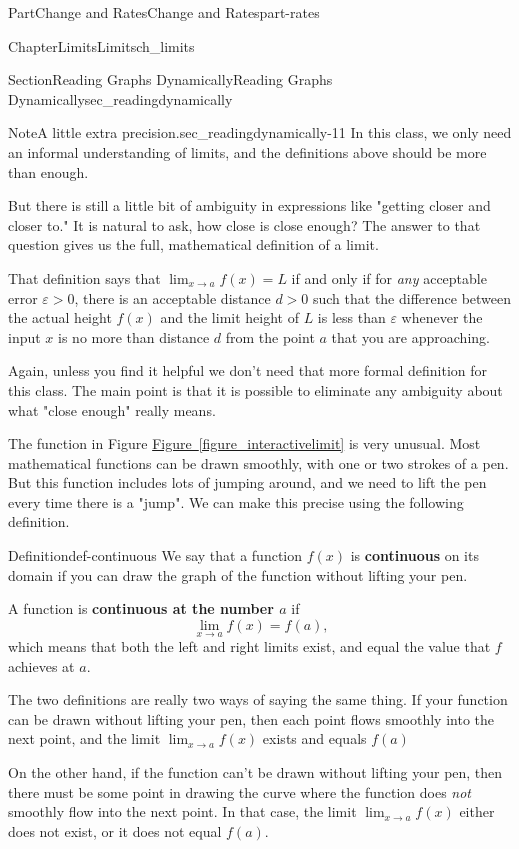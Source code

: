 \documentclass{tufte-book}
\newcommand{\xreffont}{\relax}
\newcommand{\terminology}[1]{\textbf{#1}}
\numberwithin{equation}{chapter}
\begin{document}
\begin{partptx}{Part}{Change and Rates}{}{Change and Rates}{}{}{part-rates}
\begin{chapterptx}{Chapter}{Limits}{}{Limits}{}{}{ch_limits}
\begin{sectionptx}{Section}{Reading Graphs Dynamically}{}{Reading Graphs Dynamically}{}{}{sec_readingdynamically}
\begin{note}{Note}{A little extra precision.}{sec_readingdynamically-11}
In this class, we only need an informal understanding of limits, and the definitions above should be more than enough.%
\par
But there is still a little bit of ambiguity in expressions like "getting closer and closer to."  It is natural to ask, how close is close enough? The answer to that question gives us the full, mathematical definition of a limit.%
\par
That definition says that \(\lim_{x\rightarrow a}f(x) = L\) if and only if for \emph{any} acceptable error \(\varepsilon>0\), there is an acceptable distance \(d>0\) such that the difference between the actual height \(f(x)\) and the limit height of \(L\) is less than \(\varepsilon\) whenever the input \(x\) is no more than distance \(d\) from the point \(a\) that you are approaching.%
\par
Again, unless you find it helpful we don't need that more formal definition for this class.  The main point is that it is possible to eliminate any ambiguity about what "close enough" really means.%
\end{note}
The function in Figure \hyperref[figure_interactivelimit]{Figure~{\xreffont\ref{figure_interactivelimit}}} is very unusual. Most mathematical functions can be drawn smoothly, with one or two strokes of a pen. But this function includes lots of jumping around, and we need to lift the pen every time there is a "jump". We can make this precise using the following definition.%
\begin{definition}{Definition}{}{def-continuous}%
We say that a function \(f(x)\) is \terminology{continuous} on its domain if you can draw the graph of the function without lifting your pen.%
\par
A function is \terminology{continuous at the number \(a\)} if%
\begin{equation*}
\lim_{x\rightarrow a} f(x) = f(a)\text{,}
\end{equation*}
which means that both the left and right limits exist, and equal the value that \(f\) achieves at \(a\).%
\end{definition}
The two definitions are really two ways of saying the same thing. If your function can be drawn without lifting your pen, then each point flows smoothly into the next point, and the limit \(\lim_{x\rightarrow a} f(x) \) exists and equals \(f(a)\)%
\par
On the other hand, if the function can't be drawn without lifting your pen, then there must be some point in drawing the curve where the function does \emph{not} smoothly flow into the next point.  In that case, the limit \(\lim_{x\rightarrow a}f(x)\) either does not exist, or it does not equal \(f(a)\).%

\end{sectionptx}
\end{chapterptx}
\end{partptx}
\end{document}
